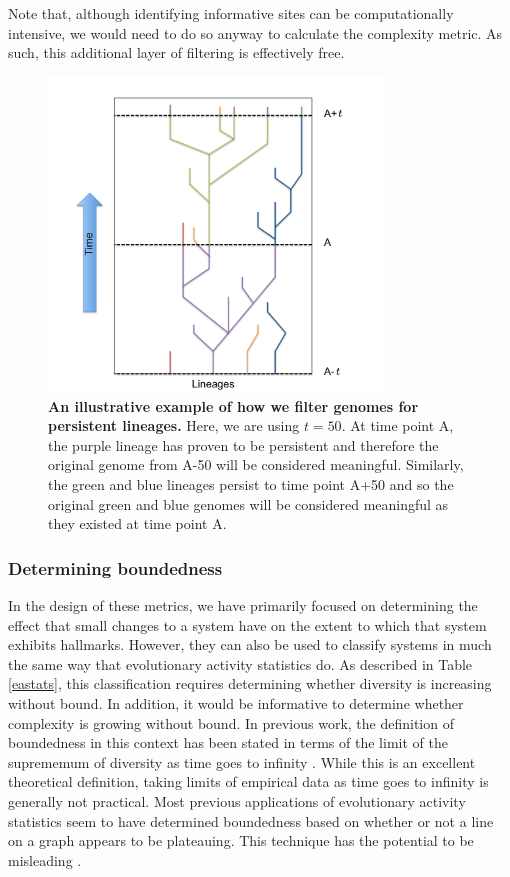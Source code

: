 \documentclass[letterpaper]{article}
\begin{document}
Note that, although identifying informative sites can be computationally intensive, we would need to do so anyway to calculate the complexity metric. As such, this additional layer of filtering is effectively free.

\begin{figure}
\includegraphics[width=3.5in]{figs/LineageFigure.png}
\caption{\textbf{An illustrative example of how we filter genomes for persistent lineages.} Here, we are using $t = 50$. At time point A, the purple lineage has proven to be persistent and therefore the original genome from A-50 will be considered meaningful. Similarly, the green and blue lineages persist to time point A+50 and so the original green and blue genomes will be considered meaningful as they existed at time point A.}
\label{lineages}
\end{figure}

\subsubsection{Determining boundedness}

In the design of these metrics, we have primarily focused on determining the effect that small changes to a system have on the extent to which that system exhibits hallmarks. However, they can also be used to classify systems in much the same way that evolutionary activity statistics do. As described in Table \ref{eastats}, this classification requires determining whether diversity is increasing without bound. In addition, it would be informative to determine whether complexity is growing without bound. In previous work, the definition of boundedness in this context has been stated in terms of the limit of the suprememum of diversity as time goes to infinity \citep{bedau_classification_1998}. While this is an excellent theoretical definition, taking limits of empirical data as time goes to infinity is generally not practical. Most previous applications of evolutionary activity statistics seem to have determined boundedness based on whether or not a line on a graph appears to be plateauing. This technique has the potential to be misleading \citep{wiser_boundedness_2018}.
\end{document}

